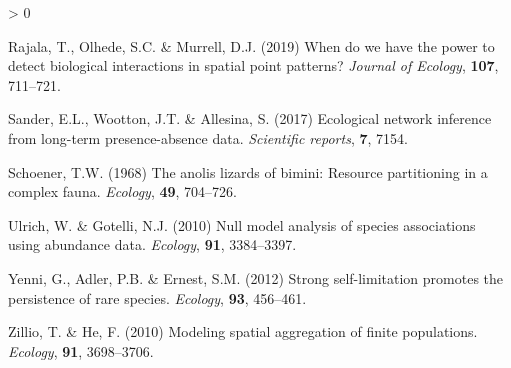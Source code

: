 \documentclass[
]{article}
\newlength{\cslhangindent}
\newenvironment{CSLReferences}[2] %
 {%
  \setlength{\parindent}{0pt}
  \ifodd #1 \everypar{\setlength{\hangindent}{\cslhangindent}}\ignorespaces\fi
  \ifnum #2 > 0
  \setlength{\parskip}{#2\baselineskip}
  \fi
 }%
 {}
\begin{document}
\begin{CSLReferences}{1}{0}
\leavevmode\hypertarget{ref-rajala2019}{}%
Rajala, T., Olhede, S.C. \& Murrell, D.J. (2019) When do we have the
power to detect biological interactions in spatial point patterns?
\emph{Journal of Ecology}, \textbf{107}, 711--721.

\leavevmode\hypertarget{ref-sander2017}{}%
Sander, E.L., Wootton, J.T. \& Allesina, S. (2017) Ecological network
inference from long-term presence-absence data. \emph{Scientific
reports}, \textbf{7}, 7154.

\leavevmode\hypertarget{ref-schoener1968}{}%
Schoener, T.W. (1968) The anolis lizards of bimini: Resource
partitioning in a complex fauna. \emph{Ecology}, \textbf{49}, 704--726.

\leavevmode\hypertarget{ref-ulrich2010}{}%
Ulrich, W. \& Gotelli, N.J. (2010) Null model analysis of species
associations using abundance data. \emph{Ecology}, \textbf{91},
3384--3397.

\leavevmode\hypertarget{ref-yenni2012}{}%
Yenni, G., Adler, P.B. \& Ernest, S.M. (2012) Strong self-limitation
promotes the persistence of rare species. \emph{Ecology}, \textbf{93},
456--461.

\leavevmode\hypertarget{ref-zillio2010}{}%
Zillio, T. \& He, F. (2010) Modeling spatial aggregation of finite
populations. \emph{Ecology}, \textbf{91}, 3698--3706.

\end{CSLReferences}
\end{document}

